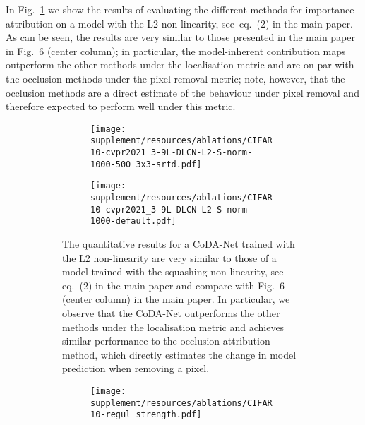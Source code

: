 In Fig.~\ref{fig:l2_ablation} we show the results of evaluating the different methods for importance attribution on a model with the L2 non-linearity, see~eq.~(2) in the main paper. As can be seen, the results are very similar to those presented in the main paper in Fig.~6 (center column); in particular, the model-inherent contribution maps outperform the other methods under the localisation metric and are on par with the occlusion methods under the pixel removal metric; note, however, that the occlusion methods are a direct estimate of the behaviour under pixel removal and therefore expected to perform well under this metric.
\begin{figure}
\centering
    \begin{subfigure}[c]{\textwidth}
    \centering
    \begin{subfigure}[c]{0.45\textwidth}
    \centering
    \texttt{[image: supplement/resources/ablations/CIFAR10-cvpr2021\_3-9L-DLCN-L2-S-norm-1000-500\_3x3-srtd.pdf]}
    \end{subfigure}
    \begin{subfigure}[c]{0.45\textwidth}
    \centering
    \texttt{[image: supplement/resources/ablations/CIFAR10-cvpr2021\_3-9L-DLCN-L2-S-norm-1000-default.pdf]}
    \end{subfigure}
    \caption{The quantitative results for a CoDA-Net trained with the L2 non-linearity are very similar to those of a model trained with the squashing non-linearity, see eq.~(2) in the main paper and compare with Fig.~6 (center column) in the main paper. In particular, we observe that the CoDA-Net outperforms the other methods under the localisation metric and achieves similar performance to the occlusion attribution method, which directly estimates the change in model prediction when removing a pixel.}
    \label{fig:l2_ablation}
    \vspace{.75em}
    \end{subfigure}
    \begin{subfigure}[c]{\textwidth}
    \centering
    \begin{subfigure}[c]{0.45\textwidth}
    \centering
    \texttt{[image: supplement/resources/ablations/CIFAR10-regul\_strength.pdf]}
    \end{subfigure}

\end{subfigure}
\end{figure}
